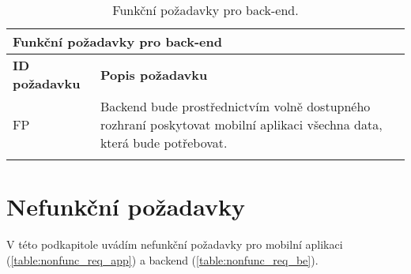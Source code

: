 \def\arraystretch{1.5}
\begin{longtable}{|l|p{9cm}|} \hline
	\multicolumn{2}{|l|}{\textbf{Funkční požadavky pro back-end}} \\ \hline
	\textbf{ID požadavku} & \textbf{Popis požadavku} \\ \hline
	
	FP\textunderscore01	& Backend bude prostřednictvím volně dostupného rozhraní poskytovat mobilní aplikaci všechna data, která bude potřebovat.  \\ \hline
	
	\caption{Funkční požadavky pro back-end.}
	\label{table:func_req_be}
\end{longtable}

\section{Nefunkční požadavky}

V této podkapitole uvádím nefunkční požadavky pro mobilní aplikaci (\ref{table:nonfunc_req_app}) a backend (\ref{table:nonfunc_req_be}).


